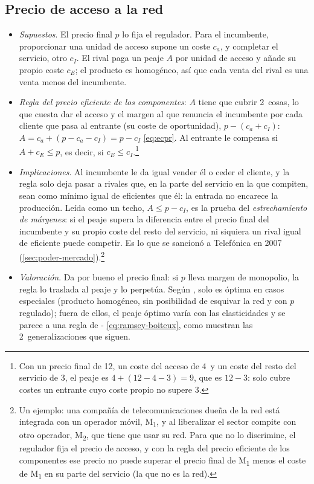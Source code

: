 \documentclass[11pt]{article}
\begin{document}
\subsection{Precio de acceso a la red}\label{anexo:acceso}

\begin{itemize}
\item \emph{Supuestos}. El precio final $p$ lo fija el regulador. Para el incumbente, proporcionar una unidad de acceso supone un coste $c_a$, y completar el servicio, otro $c_I$. El rival paga un peaje $A$ por unidad de acceso y añade su propio coste $c_E$; el producto es homogéneo, así que cada venta del rival es una venta menos del incumbente.
\item \emph{Regla del precio eficiente de los componentes}: $A$ tiene que cubrir 2~cosas, lo que cuesta dar el acceso y el margen al que renuncia el incumbente por cada cliente que pasa al entrante (su coste de oportunidad), $p-(c_a+c_I)$: $A=c_a+(p-c_a-c_I)=p-c_I$ \eqref{eq:ecpr}. Al entrante le compensa si $A+c_E\leq p$, es decir, si $c_E\leq c_I$.\footnote{Con un precio final de 12, un coste del acceso de 4~y un coste del resto del servicio de 3, el peaje es $4+(12-4-3)=9$, que es $12-3$: solo cubre costes un entrante cuyo coste propio no supere 3.}
\item \emph{Implicaciones}. Al incumbente le da igual vender él o ceder el cliente, y la regla solo deja pasar a rivales que, en la parte del servicio en la que compiten, sean como mínimo igual de eficientes que él: la entrada no encarece la producción. Leída como un techo, $A\leq p-c_I$, es la prueba del \emph{estrechamiento de márgenes}: si el peaje supera la diferencia entre el precio final del incumbente y su propio coste del resto del servicio, ni siquiera un rival igual de eficiente puede competir. Es lo que se sancionó a Telefónica en 2007 (\ref{sec:poder-mercado}).\footnote{Un ejemplo: una compañía de telecomunicaciones dueña de la red está integrada con un operador móvil, M\textsubscript{1}, y al liberalizar el sector compite con otro operador, M\textsubscript{2}, que tiene que usar su red. Para que no lo discrimine, el regulador fija el precio de acceso, y con la regla del precio eficiente de los componentes ese precio no puede superar el precio final de M\textsubscript{1} menos el coste de M\textsubscript{1} en su parte del servicio (la que no es la red).}
\item \emph{Valoración}. Da por bueno el precio final: si $p$ lleva margen de monopolio, la regla lo traslada al peaje y lo perpetúa. Según \textcite{ArmstrongDoyleVickers1996Access}, solo es óptima en casos especiales (producto homogéneo, sin posibilidad de esquivar la red y con $p$ regulado); fuera de ellos, el peaje óptimo varía con las elasticidades y se parece a una regla de - \eqref{eq:ramsey-boiteux}, como muestran las 2~generalizaciones que siguen.

\end{itemize}
\end{document}
